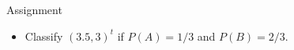 \begin{frame}{Assignment}
\begin{itemize}
\begin{scriptsize}
\begin{equation}
\begin{array}{l}
{{\begin{array}{*{20}{c}}
{4.5}\\
3
\end{array}} \right),\left( {\begin{array}{*{20}{c}}
4\\
4
\end{array}} \right),\left( {\begin{array}{*{20}{c}}
6\\
3
\end{array}} \right),\left( {\begin{array}{*{20}{c}}
4\\
6
\end{array}} \right),\left( {\begin{array}{*{20}{c}}
7\\
3
\end{array}} \right)} \right\} \in B
\end{array}\nonumber
\end{equation}
\end{scriptsize}
Using rectangular window of size $3\times 3$, compute $p((3.5,3)^t|A)$ and $p((3.5,3)^t|B)$.
\item[(c)] Classify $(3.5,3)^t$ if $P(A)=1/3$ and $P(B)=2/3$.
\end{itemize}
\end{frame}

